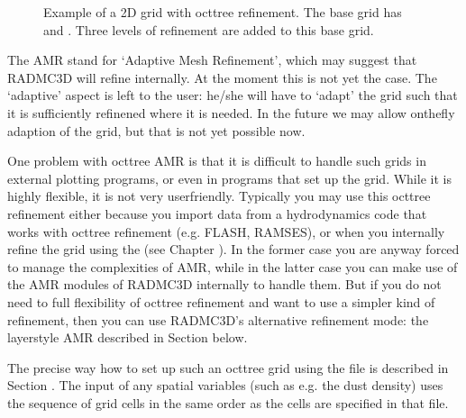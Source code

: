 \documentclass[letterpaper,10pt,english]{sphinxmanual}
\begin{document}
\begin{figure}[htbp]
\centering
\capstart

\noindent{}
\caption{Example of a 2\sphinxhyphen{}D grid with oct\sphinxhyphen{}tree refinement. The base grid has 
and . Three levels of refinement are added to this base grid.}\label{\detokenize{gridding:id4}}\label{\detokenize{gridding:fig-oct-tree-amr}}\end{figure}

The AMR stand for ‘Adaptive Mesh Refinement’, which may suggest that
RADMC\sphinxhyphen{}3D will refine internally. At the moment this is not yet the case.
The ‘adaptive’ aspect is left to the user: he/she will have to ‘adapt’
the grid such that it is sufficiently refinened where it is needed. In the
future we may allow on\sphinxhyphen{}the\sphinxhyphen{}fly adaption of the grid, but that is not yet
possible now.

One problem with oct\sphinxhyphen{}tree AMR is that it is difficult to handle such grids in
external plotting programs, or even in programs that set up the grid.  While it
is highly flexible, it is not very user\sphinxhyphen{}friendly. Typically you may use this
oct\sphinxhyphen{}tree refinement either because you import data from a hydrodynamics code
that works with oct\sphinxhyphen{}tree refinement (e.g. FLASH, RAMSES), or when you
internally refine the grid using the  (see Chapter
{\hyperref[\detokenize{internalsetup:chap-internal-setup}]{}}). In the former case you are anyway forced to manage
the complexities of AMR, while in the latter case you can make use of the AMR
modules of RADMC\sphinxhyphen{}3D internally to handle them. But if you do not need to full
flexibility of oct\sphinxhyphen{}tree refinement and want to use a simpler kind of refinement,
then you can use RADMC\sphinxhyphen{}3D’s alternative refinement mode: the layer\sphinxhyphen{}style AMR
described in Section {\hyperref[\detokenize{gridding:sec-layered-amr}]{}} below.

The precise way how to set up such an oct\sphinxhyphen{}tree grid using the 
file is described in Section {\hyperref[\detokenize{inputoutputfiles:sec-amr-grid-oct-tree}]{}}.  The input of any
spatial variables (such as e.g. the dust density) uses the sequence of grid
cells in the same order as the cells are specified in that 
file.
\end{document}
